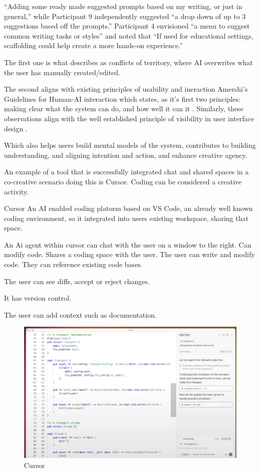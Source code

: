 “Adding some ready made suggested prompts based on my writing, or just in general,” while Participant 9 independently suggested “a drop down of up to 3 suggestions based off the prompts.” Participant 4 envisioned “a menu to suggest common writing tasks or styles” and
noted that “If used for educational settings, scaffolding
could help create a more hands-on experience.”

The first one is what \cite{Buschek2021-ks} describes as conflicts of territory, where AI overwrites what the user has manually created/edited.

The second aligns with existing principles of usability and ineraction Amershi's Guidelines for Human-AI interaction which states, as it's first two principles: making clear what the system can do, and how well it can it \cite{Amershi2019-wu}. Similarly, these observations align with the well established principle of visibility in user interface design \cite{Nielsen1994-df}.

Which also helps users build mental models of the system, contributes to building understanding, and aligning intention and action, and enhance creative agency.

An example of a tool that is successfully integrated chat and shared spaces in a co-creative scenario doing this is Cursor. 
Coding can be considered a creative activity. 

Cursor An AI enabled coding platorm based on VS Code, an already well known coding environment, so it integrated into users existing workspace, sharing that space.  

An Ai agent within cursor can chat with the user on a window to the right. Can modify code. Shares a coding space with the user. The user can write and modify code. They can reference existing code bases. 

The user can see diffs, accept or reject changes. 

It has version control. 

The user can add context such as documentation. 

\begin{figure}
    \centering
    \includegraphics[width=1\linewidth]{cursor.png}
    \caption{Cursor}
    \label{fig:enter-label}
\end{figure}

